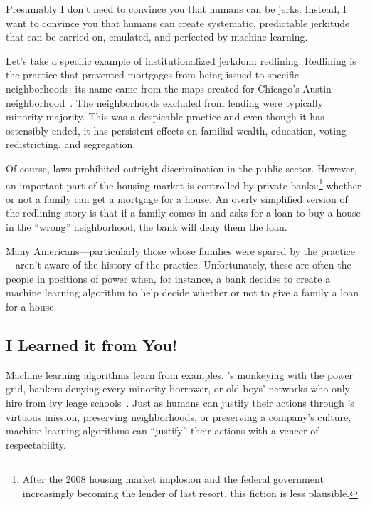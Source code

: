 

Presumably I don't need to convince you that humans can be jerks.
Instead, I want to convince you that humans can create systematic,
predictable jerkitude that can be carried on, emulated, and perfected
by machine learning.

Let's take a specific example of institutionalized jerkdom: redlining.
Redlining is the practice that prevented mortgages from being issued
to specific neighborhoods: its name came from the maps created for
Chicago's Austin neighborhood~\cite{pogge-92}.
The neighborhoods excluded from lending were typically minority-majority.
This was a despicable practice and even though it has ostensibly
ended, it has persistent effects on familial wealth, education, voting
redistricting, and segregation.

Of course, laws prohibited outright discrimination in the public
sector.  However, an important part of the housing market is
controlled by private banks:\footnote{After the 2008 housing market
  implosion and the federal government increasingly becoming the
  lender of last resort, this fiction is less plausible.} whether or
not a family can get a mortgage for a house.  An overly simplified
version of the redlining story is that if a family comes in and asks
for a loan to buy a house in the ``wrong'' neighborhood, the bank will
deny them the loan.

Many Americans---particularly those whose families were spared by the
practice---aren't aware of the history of the practice.
Unfortunately, these are often the people in positions of power when,
for instance, a bank decides to create a machine learning algorithm to
help decide whether or not to give a family a loan for a house.

\subsection{I Learned it from You!}

Machine learning algorithms learn from examples.  \energyJerk{}'s
monkeying with the power grid, bankers denying every minority
borrower, or old boys' networks who only hire from ivy leage
schools~\cite{}.  Just as humans can justify their actions through
\energyCompany{}'s virtuous mission, preserving neighborhoods, or
preserving a company's culture, machine learning algorithms can
``justify'' their actions with a veneer of respectability.

